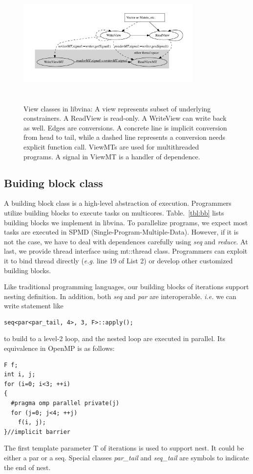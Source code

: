 \begin{figure}
\includegraphics[width=3.6in, height=2.5in]{../relationship_views}
\caption{View classes in libvina: A view represents subset of
  underlying constrainers. A ReadView is read-only. A WriteView
  can write back as well. Edges are  conversions. A concrete line is implicit conversion from head to
  tail, while a dashed line represents a conversion needs explicit function
  call. ViewMTs are used for multithreaded programs. A
  signal in ViewMT is a handler of dependence.}\label{fig:view}
\end{figure}

\subsection{Buiding block class}
A building block class is a high-level abstraction of execution. Programmers
utilize building blocks to execute tasks on multicores.
Table.~\ref{tbl:bb} lists building blocks we implement in libvina. To parallelize programs, we expect most tasks are
executed in SPMD (Single-Program-Multiple-Data). However, if it is
not the case, we have to deal with dependences carefully using \textit{seq} and \textit{reduce}. At last, we
provide thread interface using mt::thread class. Programmers can
exploit it to bind thread directly (\textit{e.g.} line 19 of List 2)
or develop other customized building blocks.

Like traditional programming languages, our
building blocks of iterations support nesting definition. In addition, both \textit{seq} and
\textit{par} are interoperable. \textit{i.e.} we can write statement like 
\begin{lstlisting}
seq<par<par_tail, 4>, 3, F>::apply();
\end{lstlisting}
to build to a level-2 loop, and the nested loop are executed in
parallel. Its equivalence in OpenMP is as follows:
\begin{lstlisting}
F f;
int i, j;
for (i=0; i<3; ++i)
{
  #pragma omp parallel private(j)
  for (j=0; j<4; ++j) 
    f(i, j);
}//implicit barrier
\end{lstlisting}
The first template parameter T  of iterations is used to support nest. It could be
either a par or a seq. Special classes \textit{par\_tail} and \textit{seq\_tail} are
symbols to indicate the end of nest.


